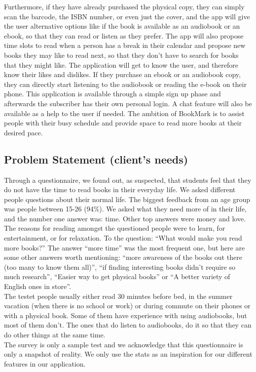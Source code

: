 \documentclass[conference]{IEEEtran}
\begin{document}
Furthermore, if they have already purchased the physical copy, they can simply scan the barcode, the ISBN number, or even just the cover, and the app will give the user alternative options like if the book is available as an audiobook or an ebook, so that they can read or listen as they prefer. The app will also propose time slots to read when a person has a break in their calendar and propose new books they may like to read next, so that they don’t have to search for books that they might like. The application will get to know the user, and therefore know their likes and dislikes. If they purchase an ebook or an audiobook copy, they can directly start listening to the audiobook or reading the e-book on their phone. This application is available through a simple sign up phase and afterwards the subscriber has their own personal login. A chat feature will also be available as a help to the user if needed. The ambition of BookMark is to assist people with their busy schedule and provide space to read more books at their desired pace.

\subsection*{Problem Statement (client's needs)}
Through a questionnaire, we found out, as suspected, that students feel that they do not have the time to read books in their everyday life. We asked different people questions about their normal life. The biggest feedback from an age group was people between 15-26 (94\%). We asked what they need more of in their life, and the number one answer was: time. Other top answers were money and love.\\
The reasons for reading amongst the questioned people were to learn, for entertainment, or for relaxation. To the question: “What would make you read more books?” The answer “more time” was the most frequent one, but here are some other answers worth mentioning: “more awareness of the books out there (too many to know them all)”, “if finding interesting books didn’t require so much research”, “Easier way to get physical books” or “A better variety of English ones in store”.\\
The testet people usually either read 30 minutes before bed, in the summer vacation (when there is no school or work) or during commute on their phones or with a physical book. Some of them have experience with using audiobooks, but most of them don't. The ones that do listen to audiobooks, do it so that they can do other things at the same time.\\
The survey is only a sample test and we acknowledge that this questionnaire is only a snapshot of reality. We only use the stats as an inspiration for our different features in our application.
\end{document}
